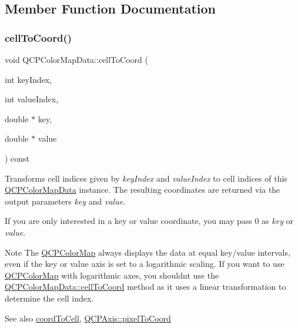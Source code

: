 \subsection{Member Function Documentation}
\mbox{\label{class_q_c_p_color_map_data_af1a36385c78ab624cd617065602408b6}} 
\subsubsection{\texorpdfstring{cell\+To\+Coord()}{cellToCoord()}}
{\footnotesize\ttfamily void Q\+C\+P\+Color\+Map\+Data\+::cell\+To\+Coord (\begin{DoxyParamCaption}\item[{int}]{key\+Index,  }\item[{int}]{value\+Index,  }\item[{double $\ast$}]{key,  }\item[{double $\ast$}]{value }\end{DoxyParamCaption}) const}

Transforms cell indices given by {\itshape key\+Index} and {\itshape value\+Index} to cell indices of this \hyperlink{class_q_c_p_color_map_data}{Q\+C\+P\+Color\+Map\+Data} instance. The resulting coordinates are returned via the output parameters {\itshape key} and {\itshape value}.

If you are only interested in a key or value coordinate, you may pass 0 as {\itshape key} or {\itshape value}.

\begin{DoxyNote}{Note}
The \hyperlink{class_q_c_p_color_map}{Q\+C\+P\+Color\+Map} always displays the data at equal key/value intervals, even if the key or value axis is set to a logarithmic scaling. If you want to use \hyperlink{class_q_c_p_color_map}{Q\+C\+P\+Color\+Map} with logarithmic axes, you shouldn\textquotesingle{}t use the \hyperlink{class_q_c_p_color_map_data_af1a36385c78ab624cd617065602408b6}{Q\+C\+P\+Color\+Map\+Data\+::cell\+To\+Coord} method as it uses a linear transformation to determine the cell index.
\end{DoxyNote}
\begin{DoxySeeAlso}{See also}
\hyperlink{class_q_c_p_color_map_data_aca5b29e0ca2f299c9060fc6e1f74d0c8}{coord\+To\+Cell}, \hyperlink{class_q_c_p_axis_a536ef8f624cac59b6b6fdcb495723c57}{Q\+C\+P\+Axis\+::pixel\+To\+Coord} 
\end{DoxySeeAlso}


